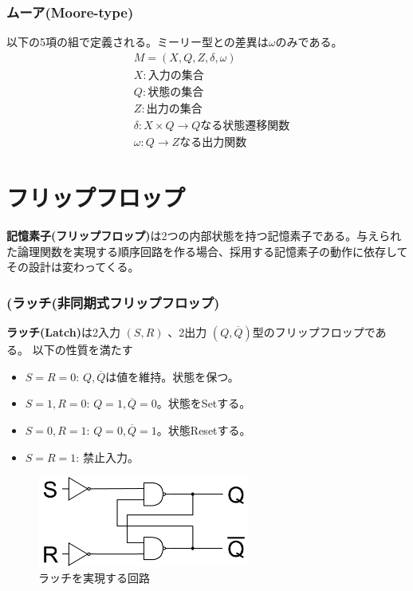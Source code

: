 \documentclass[a4j,10pt,oneside,openany,fleqn]{jsbook}
\begin{document}
\subsubsection{ムーア(Moore-type)}
以下の5項の組で定義される。ミーリー型との差異は$\omega$のみである。
\begin{align*}
  &M = (X, Q, Z, \delta, \omega)\\
  &X:\textrm{入力の集合}\\
  &Q:\textrm{状態の集合}\\
  &Z:\textrm{出力の集合}\\
  &\delta:X \times Q \rightarrow Q\textrm{なる状態遷移関数}\\
  &\omega:Q \rightarrow Z\textrm{なる出力関数}
\end{align*}

\section{フリップフロップ}
\textbf{記憶素子(フリップフロップ)}は2つの内部状態を持つ記憶素子である。与えられた論理関数を実現する順序回路を作る場合、採用する記憶素子の動作に依存してその設計は変わってくる。

\subsubsection{(ラッチ(非同期式フリップフロップ)}
\textbf{ラッチ(Latch)}は2入力 $(S, R)$ 、2出力 $(Q, \overline{Q})$型のフリップフロップである。
以下の性質を満たす
\begin{itemize}
  \item $S=R=0$: $Q, \overline{Q}$は値を維持。状態を保つ。
  \item $S=1, R=0$: $Q = 1, \overline{Q} = 0$。状態をSetする。
  \item $S=0, R=1$: $Q = 0, \overline{Q} = 1$。状態Resetする。
  \item $S=R=1$: 禁止入力。
\end{itemize}
\begin{figure}[h]
  \centering\includegraphics[height=3cm]{Images/Latch.png}
  \caption{ラッチを実現する回路}
\end{figure}
\end{document}
